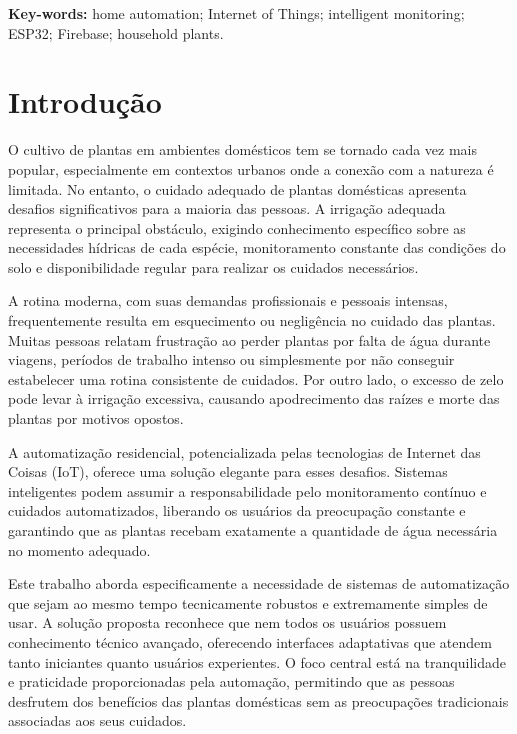 \documentclass[twoside,english,brazilian]{UNISINOSmonografia}
\begin{document}
\medskip
\noindent\textbf{Key-words:} home automation; Internet of Things; intelligent monitoring; ESP32; Firebase; household plants.

\chapter{Introdução}

O cultivo de plantas em ambientes domésticos tem se tornado cada vez mais popular, especialmente em contextos urbanos onde a conexão com a natureza é limitada. No entanto, o cuidado adequado de plantas domésticas apresenta desafios significativos para a maioria das pessoas. A irrigação adequada representa o principal obstáculo, exigindo conhecimento específico sobre as necessidades hídricas de cada espécie, monitoramento constante das condições do solo e disponibilidade regular para realizar os cuidados necessários.

A rotina moderna, com suas demandas profissionais e pessoais intensas, frequentemente resulta em esquecimento ou negligência no cuidado das plantas. Muitas pessoas relatam frustração ao perder plantas por falta de água durante viagens, períodos de trabalho intenso ou simplesmente por não conseguir estabelecer uma rotina consistente de cuidados. Por outro lado, o excesso de zelo pode levar à irrigação excessiva, causando apodrecimento das raízes e morte das plantas por motivos opostos.


A automatização residencial, potencializada pelas tecnologias de Internet das Coisas (IoT), oferece uma solução elegante para esses desafios. Sistemas inteligentes podem assumir a responsabilidade pelo monitoramento contínuo e cuidados automatizados, liberando os usuários da preocupação constante e garantindo que as plantas recebam exatamente a quantidade de água necessária no momento adequado.

Este trabalho aborda especificamente a necessidade de sistemas de automatização que sejam ao mesmo tempo tecnicamente robustos e extremamente simples de usar. A solução proposta reconhece que nem todos os usuários possuem conhecimento técnico avançado, oferecendo interfaces adaptativas que atendem tanto iniciantes quanto usuários experientes. O foco central está na tranquilidade e praticidade proporcionadas pela automação, permitindo que as pessoas desfrutem dos benefícios das plantas domésticas sem as preocupações tradicionais associadas aos seus cuidados.
\end{document}
